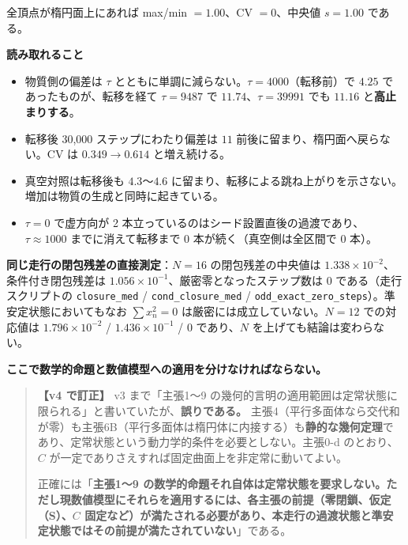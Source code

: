 \documentclass[
  10pt,
]{ltjsarticle}
\providecommand{\tightlist}{%
  \setlength{\itemsep}{0pt}\setlength{\parskip}{0pt}}
\begin{document}
全頂点が楕円面上にあれば max/min \(= 1.00\)、CV \(= 0\)、中央値
\(s = 1.00\) である。

\textbf{読み取れること}

\begin{itemize}
\tightlist
\item
  物質側の偏差は \(\tau\)
  とともに単調に減らない。\(\tau = 4000\)（転移前）で \(4.25\)
  であったものが、転移を経て \(\tau = 9487\) で
  \(11.74\)、\(\tau = 39991\) でも \(11.16\) と\textbf{高止まりする}。
\item
  転移後 30,000 ステップにわたり偏差は \(11\)
  前後に留まり、楕円面へ戻らない。CV は \(0.349 \to 0.614\)
  と増え続ける。
\item
  真空対照は転移後も \(4.3\)〜\(4.6\)
  に留まり、転移による跳ね上がりを示さない。増加は物質の生成と同時に起きている。
\item
  \(\tau = 0\) で虚方向が 2
  本立っているのはシード設置直後の過渡であり、\(\tau \approx 1000\)
  までに消えて転移まで 0 本が続く（真空側は全区間で 0 本）。
\end{itemize}

\textbf{同じ走行の閉包残差の直接測定}：\(N = 16\) の閉包残差の中央値は
\(1.338\times10^{-2}\)、条件付き閉包残差は
\(1.056\times10^{-1}\)、厳密零となったステップ数は \(0\)
である（走行スクリプトの \texttt{closure\_med} /
\texttt{cond\_closure\_med} /
\texttt{odd\_exact\_zero\_steps}）。準安定状態においてもなお
\(\sum x_n^2 = 0\) は厳密には成立していない。\(N=12\) での対応値は
\(1.796\times10^{-2}\) / \(1.436\times10^{-1}\) / \(0\) であり、\(N\)
を上げても結論は変わらない。

\textbf{ここで数学的命題と数値模型への適用を分けなければならない。}

\begin{quote}
\textbf{【v4 で訂正】} v3 まで「主張1〜9
の幾何的言明の適用範囲は定常状態に限られる」と書いていたが、\textbf{誤りである。}
主張4（平行多面体なら交代和が零）も主張6B（平行多面体は楕円体に内接する）も\textbf{静的な幾何定理}であり、定常状態という動力学的条件を必要としない。主張0-d
のとおり、\(C\) が一定でありさえすれば固定曲面上を非定常に動いてよい。

正確には「\textbf{主張1〜9
の数学的命題それ自体は定常状態を要求しない。ただし現数値模型にそれらを適用するには、各主張の前提（零閉鎖、仮定（S）、\(C\)
固定など）が満たされる必要があり、本走行の過渡状態と準安定状態ではその前提が満たされていない}」である。
\end{quote}
\end{document}
